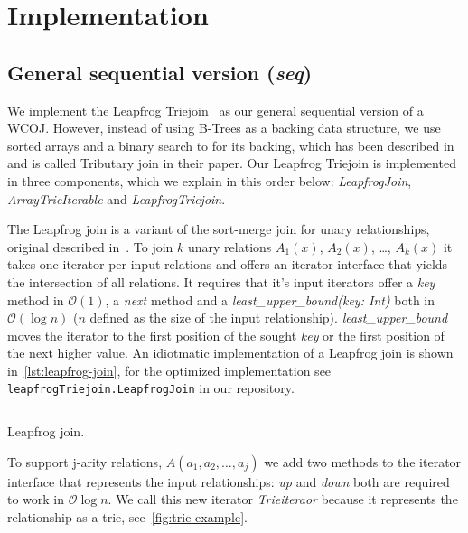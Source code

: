\section{Implementation}\label{sec:implementation}

\subsection{General sequential version (\textit{seq})}\label{subsec:general-sequential-version}
We implement the Leapfrog Triejoin~\cite{leapfrog} as our general sequential version of a WCOJ.
However, instead of using B-Trees as a backing data structure, we use sorted arrays and a binary search
to for its backing, which has been described in~\cite{myria-detailed} and is called Tributary join in their paper.
Our Leapfrog Triejoin is implemented in three components, which we explain in this order below: \textit{LeapfrogJoin}, \textit{ArrayTrieIterable} and
\textit{LeapfrogTriejoin}.

The Leapfrog join is a variant of the sort-merge join for unary relationships, original described in~\cite{leapfrog1,leapfrog2}. %
To join $k$ unary relations $A_1(x)$, $A_2(x)$, \dots, $A_k(x)$ it takes one iterator per input relations and offers an iterator
interface that yields the intersection of all relations.
It requires that it's input iterators offer a \textit{key} method in $\mathcal{O}(1)$, a \textit{next} method and
a \textit{least\_upper\_bound(key: Int)} both in $\mathcal{O} (\log n)$ ($n$ defined as the size of the input relationship).
\textit{least\_upper\_bound} moves the iterator to the first position of the sought \textit{key} or the first position of the
next higher value.
An idiotmatic implementation of a Leapfrog join is shown in~\cref{lst:leapfrog-join}, for the optimized implementation see
\texttt{leapfrogTriejoin.LeapfrogJoin} in our repository.  %

\begin{listing}[H]
    \inputminted{scala}{code/LeapfrogJoin.scala}
    \caption{Leapfrog join.}
    \label{lst:leapfrog-join}
\end{listing}

To support j-arity relations, $A(a_1, a_2, \dots, a_j)$ we add two methods to the iterator interface that represents the input
relationships: \textit{up} and \textit{down} both are required to work in $\mathcal{O} \log n$.
We call this new iterator \textit{Trieiteraor} because it represents the relationship as a trie, see~\cref{fig:trie-example}.

